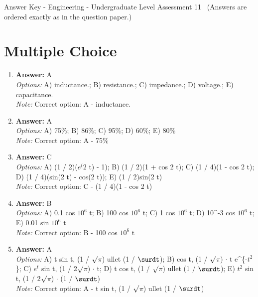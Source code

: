 \documentclass[12pt]{article}
\begin{document}
\begin{center}
Answer Key - Engineering - Undergraduate Level Assessment 11 \
\small (Answers are ordered exactly as in the question paper.)
\end{center}

\section*{Multiple Choice}
\begin{enumerate}[label=\arabic*.]
\item \textbf{Answer:} A
\\ \textit{Options:} A) inductance.; B) resistance.; C) impedance.; D) voltage.; E) capacitance.
\\ \textit{Note:} Correct option: A - inductance.
\item \textbf{Answer:} A
\\ \textit{Options:} A) 75\%; B) 86\%; C) 95\%; D) 60\%; E) 80\%
\\ \textit{Note:} Correct option: A - 75\%
\item \textbf{Answer:} C
\\ \textit{Options:} A) (1 / 2)($e^(2$ t) - 1); B) (1 / 2)(1 + cos 2 t); C) (1 / 4)(1 - cos 2 t); D) (1 / 4)(sin(2 t) - cos(2 t)); E) (1 / 2)sin(2 t)
\\ \textit{Note:} Correct option: C - (1 / 4)(1 - cos 2 t)
\item \textbf{Answer:} B
\\ \textit{Options:} A) 0.1 cos $10^6$ t; B) 100 cos $10^6$ t; C) 1 cos $10^6$ t; D) 10^-3 cos $10^6$ t; E) 0.01 sin $10^6$ t
\\ \textit{Note:} Correct option: B - 100 cos $10^6$ t
\item \textbf{Answer:} A
\\ \textit{Options:} A) t sin t, (1 / \ensuremath{\surd}\ensuremath{\pi}) ullet (1 / \ensuremath{\surdt}); B) cos t, (1 / \ensuremath{\surd}\ensuremath{\pi}) \ensuremath{\cdot} t e^\{-$t^2$\}; C) $e^t$ sin t, (1 / 2\ensuremath{\surd}\ensuremath{\pi}) \ensuremath{\cdot} t; D) t cos t, (1 / \ensuremath{\surd}\ensuremath{\pi}) ullet (1 / \ensuremath{\surdt}); E) $t^2$ sin t, (1 / 2\ensuremath{\surd}\ensuremath{\pi}) \ensuremath{\cdot} (1 / \ensuremath{\surdt})
\\ \textit{Note:} Correct option: A - t sin t, (1 / \ensuremath{\surd}\ensuremath{\pi}) ullet (1 / \ensuremath{\surdt})
\end{enumerate}
\end{document}
